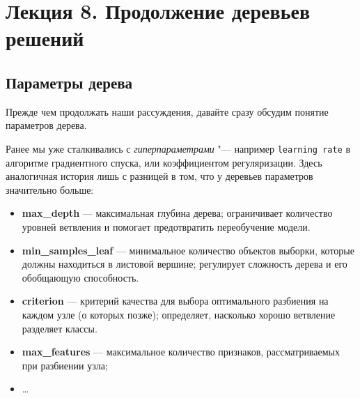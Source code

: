 \section* {Лекция 8. Продолжение деревьев решений}

\subsection*{Параметры дерева}
Прежде чем продолжать наши рассуждения, давайте сразу обсудим понятие параметров дерева.

Ранее мы уже сталкивались с \textit{гиперпараметрами} "--- например \texttt{learning rate} в алгоритме градиентного спуска, или коэффициентом регуляризации. Здесь аналогичная история лишь с разницей в том, что у деревьев параметров значительно больше:
\begin{itemize}
  \item \textbf{max\_depth} — максимальная глубина дерева; ограничивает количество уровней ветвления и помогает предотвратить переобучение модели.
  
  \item \textbf{min\_samples\_leaf} — минимальное количество объектов выборки, которые должны находиться в листовой вершине; регулирует сложность дерева и его обобщающую способность.
  
  \item \textbf{criterion} — критерий качества для выбора оптимального разбиения на каждом узле (о которых позже); определяет, насколько хорошо ветвление разделяет классы.
  
  \item \textbf{max\_features} — максимальное количество признаков, рассматриваемых при разбиении узла;

  \item \dots
\end{itemize}

